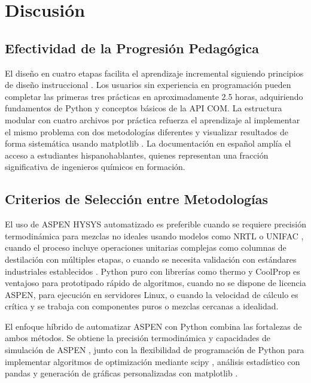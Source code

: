 \documentclass{syx7}
\begin{document}
\section{Discusión}

\subsection{Efectividad de la Progresión Pedagógica}

El diseño en cuatro etapas facilita el aprendizaje incremental siguiendo principios de diseño instruccional \cite{seider2016product}. Los usuarios sin experiencia en programación pueden completar las primeras tres prácticas en aproximadamente 2.5 horas, adquiriendo fundamentos de Python y conceptos básicos de la API COM. La estructura modular con cuatro archivos por práctica refuerza el aprendizaje al implementar el mismo problema con dos metodologías diferentes y visualizar resultados de forma sistemática usando matplotlib \cite{hunter2007matplotlib}. La documentación en español amplía el acceso a estudiantes hispanohablantes, quienes representan una fracción significativa de ingenieros químicos en formación.

\subsection{Criterios de Selección entre Metodologías}

El uso de ASPEN HYSYS automatizado es preferible cuando se requiere precisión termodinámica para mezclas no ideales usando modelos como NRTL \cite{renon1968local} o UNIFAC \cite{fredenslund1975group}, cuando el proceso incluye operaciones unitarias complejas como columnas de destilación con múltiples etapas, o cuando se necesita validación con estándares industriales establecidos \cite{astm2020biodiesel}. Python puro con librerías como thermo \cite{thermo2023} y CoolProp \cite{bell2016coolprop} es ventajoso para prototipado rápido de algoritmos, cuando no se dispone de licencia ASPEN, para ejecución en servidores Linux, o cuando la velocidad de cálculo es crítica y se trabaja con componentes puros o mezclas cercanas a idealidad.

El enfoque híbrido de automatizar ASPEN con Python combina las fortalezas de ambos métodos. Se obtiene la precisión termodinámica y capacidades de simulación de ASPEN \cite{aspentech2020hysys}, junto con la flexibilidad de programación de Python \cite{python2023} para implementar algoritmos de optimización mediante scipy \cite{virtanen2020scipy}, análisis estadístico con pandas \cite{mckinney2010data} y generación de gráficas personalizadas con matplotlib \cite{hunter2007matplotlib}.
\end{document}
